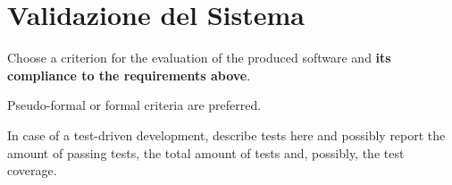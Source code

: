 \section{Validazione del Sistema}

Choose a criterion for the evaluation of the produced software and \textbf{its compliance to the requirements above}.

Pseudo-formal or formal criteria are preferred.

In case of a test-driven development, describe tests here and possibly report the amount of passing tests, the total amount of tests and, possibly, the test coverage.